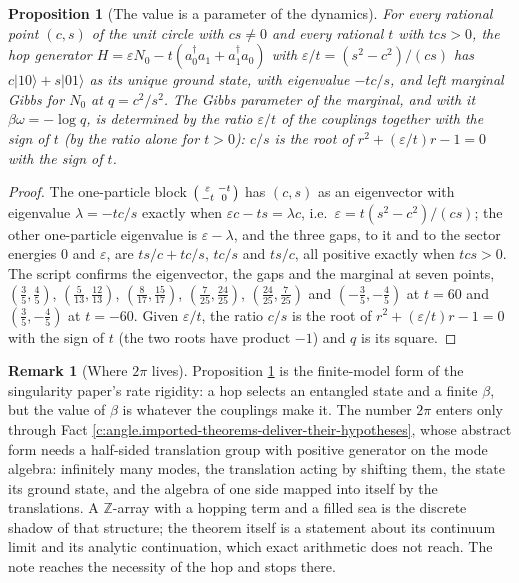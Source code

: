 \documentclass[11pt]{article}
\newtheorem{proposition}[theorem]{Proposition}
\theoremstyle{definition}
\newtheorem{remark}[theorem]{Remark}
\theoremstyle{plain}
\providecommand{\ket}{}\renewcommand{\ket}[1]{|#1\rangle}
\begin{document}
\begin{proposition}[The value is a parameter of the dynamics]\label{c:angle.value-parameter-dynamics}
For every rational point $(c, s)$ of the unit circle with $cs \neq 0$ and every rational $t$ with $tcs > 0$, the hop generator $H = \varepsilon N_{0} - t(a^{\dagger}_{0}a_{1} + a^{\dagger}_{1}a_{0})$ with $\varepsilon/t = (s^{2} - c^{2})/(cs)$ has $c\ket{10} + s\ket{01}$ as its unique ground state, with eigenvalue $-tc/s$, and left marginal Gibbs for $N_{0}$ at $q = c^{2}/s^{2}$. The Gibbs parameter of the marginal, and with it $\beta\omega = -\log q$, is determined by the ratio $\varepsilon/t$ of the couplings together with the sign of $t$ (by the ratio alone for $t > 0$): $c/s$ is the root of $r^{2} + (\varepsilon/t)r - 1 = 0$ with the sign of $t$.
\end{proposition}
\begin{proof}
The one-particle block $\begin{psmallmatrix} \varepsilon & -t \\ -t & 0\end{psmallmatrix}$ has $(c, s)$ as an eigenvector with eigenvalue $\lambda = -tc/s$ exactly when $\varepsilon c - ts = \lambda c$, i.e.\ $\varepsilon = t(s^{2} - c^{2})/(cs)$; the other one-particle eigenvalue is $\varepsilon - \lambda$, and the three gaps, to it and to the sector energies $0$ and $\varepsilon$, are $ts/c + tc/s$, $tc/s$ and $ts/c$, all positive exactly when $tcs > 0$. The script confirms the eigenvector, the gaps and the marginal at seven points, $(\tfrac35, \tfrac45)$, $(\tfrac{5}{13}, \tfrac{12}{13})$, $(\tfrac{8}{17}, \tfrac{15}{17})$, $(\tfrac{7}{25}, \tfrac{24}{25})$, $(\tfrac{24}{25}, \tfrac{7}{25})$ and $(-\tfrac35, -\tfrac45)$ at $t = 60$ and $(\tfrac35, -\tfrac45)$ at $t = -60$. Given $\varepsilon/t$, the ratio $c/s$ is the root of $r^{2} + (\varepsilon/t)r - 1 = 0$ with the sign of $t$ (the two roots have product $-1$) and $q$ is its square.

\end{proof}

\begin{remark}[Where $2\pi$ lives]\label{c:note.angle.where-2-lives}
Proposition \ref{c:angle.value-parameter-dynamics} is the finite-model form of the singularity paper's rate rigidity: a hop selects an entangled state and a finite $\beta$, but the value of $\beta$ is whatever the couplings make it. The number $2\pi$ enters only through Fact \ref{c:angle.imported-theorems-deliver-their-hypotheses}, whose abstract form needs a half-sided translation group with positive generator on the mode algebra: infinitely many modes, the translation acting by shifting them, the state its ground state, and the algebra of one side mapped into itself by the translations. A ${\mathbb{Z}}$-array with a hopping term and a filled sea is the discrete shadow of that structure; the theorem itself is a statement about its continuum limit and its analytic continuation, which exact arithmetic does not reach. The note reaches the necessity of the hop and stops there.
\end{remark}
\end{document}
